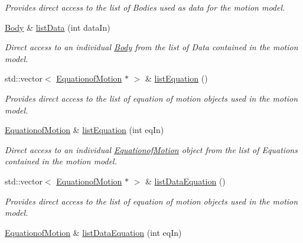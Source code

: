 \begin{DoxyCompactItemize}
\begin{DoxyCompactList}\small\item\em Provides direct access to the list of Bodies used as data for the motion model. \end{DoxyCompactList}\item 
\hyperlink{classosea_1_1ofreq_1_1_body}{Body} \& \hyperlink{classosea_1_1ofreq_1_1_motion_model_a1d7e2b929c15789259aaf732efd7f752}{list\-Data} (int data\-In)
\begin{DoxyCompactList}\small\item\em Direct access to an individual \hyperlink{classosea_1_1ofreq_1_1_body}{Body} from the list of Data contained in the motion model. \end{DoxyCompactList}\item 
std\-::vector$<$ \hyperlink{classosea_1_1ofreq_1_1_equationof_motion}{Equationof\-Motion} $\ast$ $>$ \& \hyperlink{classosea_1_1ofreq_1_1_motion_model_a998756fbf76a5c65773f5eae7bf9a3e1}{list\-Equation} ()
\begin{DoxyCompactList}\small\item\em Provides direct access to the list of equation of motion objects used in the motion model. \end{DoxyCompactList}\item 
\hyperlink{classosea_1_1ofreq_1_1_equationof_motion}{Equationof\-Motion} \& \hyperlink{classosea_1_1ofreq_1_1_motion_model_a444cd6e6ca1aea0822545b732118aeb9}{list\-Equation} (int eq\-In)
\begin{DoxyCompactList}\small\item\em Direct access to an individual \hyperlink{classosea_1_1ofreq_1_1_equationof_motion}{Equationof\-Motion} object from the list of Equations contained in the motion model. \end{DoxyCompactList}\item 
std\-::vector$<$ \hyperlink{classosea_1_1ofreq_1_1_equationof_motion}{Equationof\-Motion} $\ast$ $>$ \& \hyperlink{classosea_1_1ofreq_1_1_motion_model_a644171d63e9dba6a0b1ec57be33653f7}{list\-Data\-Equation} ()
\begin{DoxyCompactList}\small\item\em Provides direct access to the list of equation of motion objects used in the motion model. \end{DoxyCompactList}\item 
\hyperlink{classosea_1_1ofreq_1_1_equationof_motion}{Equationof\-Motion} \& \hyperlink{classosea_1_1ofreq_1_1_motion_model_a485a85942201e939102865f8923d9a51}{list\-Data\-Equation} (int eq\-In)

\end{DoxyCompactItemize}
